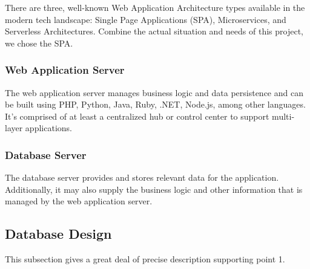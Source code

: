 There are three, well-known Web Application Architecture types available in the modern tech landscape: Single Page Applications (SPA), Microservices, and Serverless Architectures. Combine the actual situation and needs of this project, we chose the SPA.

\subsubsection{Web Application Server}
The web application server manages business logic and data persistence and can be built using PHP, Python, Java, Ruby, .NET, Node.js, among other languages. It’s comprised of at least a centralized hub or control center to support multi-layer applications.

\subsubsection{Database Server}
The database server provides and stores relevant data for the application. Additionally, it may also supply the business logic and other information that is managed by the web application server.

\subsection{Database Design}
This subsection gives a great deal of precise description supporting point 1.

